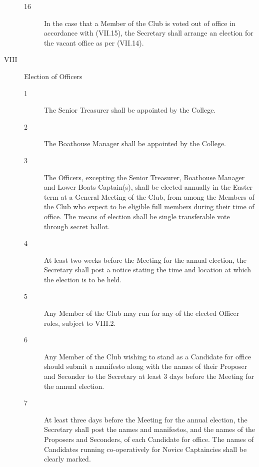 \documentclass{article}
\begin{document}
\begin{description}
\begin{description}
		\item[16] In the case that a Member of the Club is voted out of office in accordance with
		(VII.15), the Secretary shall arrange an election for the vacant office as per
		(VII.14).
		
	\end{description}

	\item[VIII] Election of Officers
	\begin{description}
		\item[1] The Senior Treasurer shall be appointed by the College.\\
		
		\item[2] The Boathouse Manager shall be appointed by the College.\\
		
		\item[3] The Officers, excepting the Senior Treasurer, Boathouse Manager and Lower
		Boats Captain(s), shall be elected annually in the Easter term at a General
		Meeting of the Club, from among the Members of the Club who expect to be
		eligible full members during their time of office. The means of election shall
		be single transferable vote through secret ballot.\\
		
		\item[4] At least two weeks before the Meeting for the annual election, the Secretary
		shall post a notice stating the time and location at which the election is to be
		held.\\
		
		\item[5] Any Member of the Club may run for any of the elected Officer roles, subject
		to VIII.2.\\
		
		\item[6] Any Member of the Club wishing to stand as a Candidate for office should
		submit a manifesto along with the names of their Proposer and Seconder to the
		Secretary at least 3 days before the Meeting for the annual election.\\
		
		\item[7] At least three days before the Meeting for the annual election, the Secretary
		shall post the names and manifestos, and the names of the Proposers and
		Seconders, of each Candidate for office. The names of Candidates running
		co-operatively for Novice Captaincies shall be clearly marked.\\
		

\end{description}
\end{description}
\end{document}
